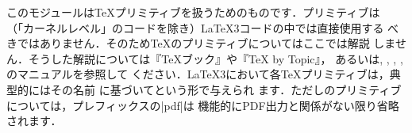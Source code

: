 \documentclass[uplatex,dvipdfmx,full,kernel]{wtpl3doc}
\begin{document}
\begin{documentation}
このモジュールは\TeX プリミティブを扱うためのものです．プリミティブは
（「カーネルレベル」のコードを除き）\LaTeX3コードの中では直接使用する
べきではありません．そのため\TeX のプリミティブについてはここでは解説
しません．そうした解説については『\TeX ブック』や『{\TeX} by Topic』，
あるいは\pdfTeX, \XeTeX, \LuaTeX, \pTeX, \upTeX のマニュアルを参照して
ください．\LaTeX3において各\TeX プリミティブは，典型的にはその名前
に基づいてという形で与えられ
ます．ただし\pdfTeX のプリミティブについては，プレフィックスの|pdf|は
機能的にPDF出力と関係がない限り省略されます．

\end{documentation}
\end{document}
